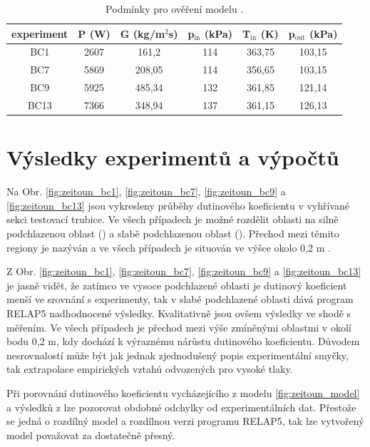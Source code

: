 \begin{table}[h]
	\centering
	\caption{Podmínky pro ověření modelu \cite{zeitoun1994subcooled}.}
	\label{tab:zeitoun_podminky}
	\begin{tabular}{cccccc}
		\hline
	experiment & P (W)            & G (kg/m$^2$s) & p$_{\text{in}}$ (kPa) & T$_{\text{in}}$ (K) & p$_{\text{out}}$ (kPa) \\
	\hline \hline
	BC1        & 2607 & 161,2      & 114         & 363,75    & 103,15    \\
	BC7        & 5869 & 208,05     & 114         & 356,65    & 103,15    \\
	BC9        & 5925 & 485,34     & 132         & 361,85    & 121,14   \\
	BC13       & 7366 & 348,94     & 137         & 361,15    & 126,13     \\ \hline
		\end{tabular}

	
\end{table}
\section{Výsledky experimentů a výpočtů}
Na Obr. \ref{fig:zeitoun_bc1}, \ref{fig:zeitoun_bc7}, \ref{fig:zeitoun_bc9} a \ref{fig:zeitoun_bc13} jsou vykresleny průběhy dutinového koeficientu v vyhřívané sekci testovací trubice. Ve všech případech je možné rozdělit oblasti na silně podchlazenou oblast () a slabě podchlazenou oblast (). Přechod mezi těmito regiony je nazýván  a ve všech případech je situován ve výšce okolo 0,2 m \cite{KONCAR2003255}.  

Z Obr. \ref{fig:zeitoun_bc1}, \ref{fig:zeitoun_bc7}, \ref{fig:zeitoun_bc9} a \ref{fig:zeitoun_bc13} je jasně vidět, že zatímco ve vysoce podchlazené oblasti je dutinový koeficient menší ve srovnání s experimenty, tak v slabě podchlazené oblasti dává program RELAP5 nadhodnocené výsledky. Kvalitativně jsou ovšem výsledky ve shodě s měřením. Ve všech případech je přechod mezi výše zmíněnými oblastmi v okolí bodu 0,2 m, kdy dochází k výraznému nárůstu dutinového koeficientu. Důvodem nesrovnalostí může být jak jednak zjednodušený popis experimentální smyčky, tak extrapolace empirických vztahů odvozených pro vysoké tlaky. 

Při porovnání dutinového koeficientu vycházejícího z modelu \ref{fig:zeitoun_model} a výsledků z \cite{KONCAR2003255} lze pozorovat obdobné odchylky od experimentálních dat. Přestože se jedná o rozdílný model a rozdílnou verzi programu RELAP5, tak lze vytvořený model považovat za dostatečně přesný. 

